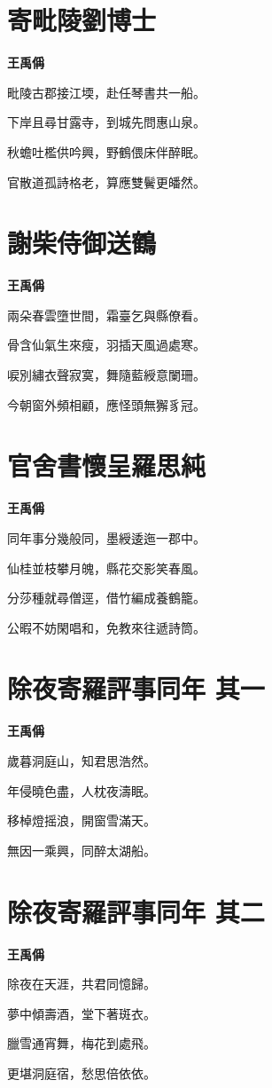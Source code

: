\documentclass[12pt,a4paper]{ctexbook}
\begin{document}
\section{寄毗陵劉博士}
\textbf{王禹偁}\par\vspace{0.5em}
毗陵古郡接江堧，赴任琴書共一船。\par
下岸且尋甘露寺，到城先問惠山泉。\par
秋蟾吐檻供吟興，野鶴偎床伴醉眠。\par
官散道孤詩格老，算應雙鬢更皤然。\par

\section{謝柴侍御送鶴}
\textbf{王禹偁}\par\vspace{0.5em}
兩朵春雲墮世間，霜臺乞與縣僚看。\par
骨含仙氣生來瘦，羽插天風過處寒。\par
唳別繡衣聲寂寞，舞隨藍綬意闌珊。\par
今朝窗外頻相顧，應怪頭無獬豸冠。\par

\section{官舍書懷呈羅思純}
\textbf{王禹偁}\par\vspace{0.5em}
同年事分幾般同，墨綬逶迤一郡中。\par
仙桂並枝攀月魄，縣花交影笑春風。\par
分莎種就尋僧逕，借竹編成養鶴籠。\par
公暇不妨閑唱和，免教來往遞詩筒。\par

\section{除夜寄羅評事同年  其一}
\textbf{王禹偁}\par\vspace{0.5em}
歲暮洞庭山，知君思浩然。\par
年侵曉色盡，人枕夜濤眠。\par
移棹燈摇浪，開窗雪滿天。\par
無因一乘興，同醉太湖船。\par

\section{除夜寄羅評事同年  其二}
\textbf{王禹偁}\par\vspace{0.5em}
除夜在天涯，共君同憶歸。\par
夢中傾壽酒，堂下著斑衣。\par
臘雪通宵舞，梅花到處飛。\par
更堪洞庭宿，愁思倍依依。\par
\end{document}
